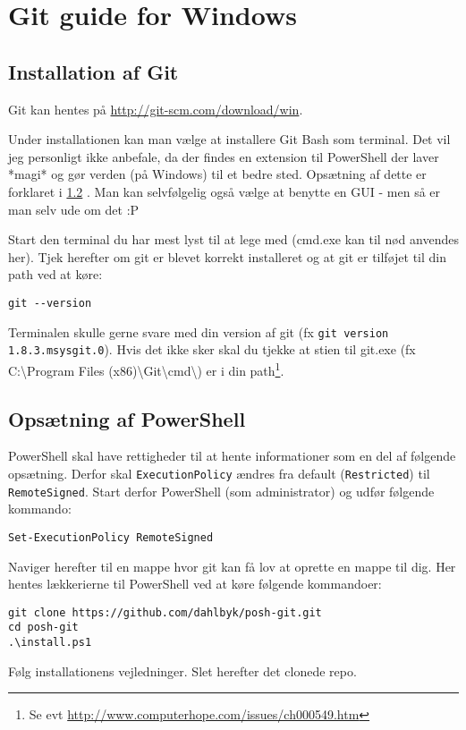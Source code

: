 \chapter{Git guide for Windows}
\section{Installation af Git}
Git kan hentes på \url{http://git-scm.com/download/win}.

Under installationen kan man vælge at installere Git Bash som terminal.
Det vil jeg personligt ikke anbefale, da der findes en extension til PowerShell der laver *magi* og gør verden (på Windows) til et bedre sted.
Opsætning af dette er forklaret i \ref{gitguide:powershell} .
Man kan selvfølgelig også vælge at benytte en GUI - men så er man selv ude om det :P

Start den terminal du har mest lyst til at lege med (cmd.exe kan til nød anvendes her).
Tjek herefter om git er blevet korrekt installeret og at git er tilføjet til din path ved at køre:
\begin{lstlisting}
git --version
\end{lstlisting}
Terminalen skulle gerne svare med din version af git (fx \texttt{git version 1.8.3.msysgit.0}).
Hvis det ikke sker skal du tjekke at stien til git.exe (fx C:\textbackslash{}Program Files (x86)\textbackslash{}Git\textbackslash{}cmd\textbackslash{}) er i din path\footnote{Se evt \url{http://www.computerhope.com/issues/ch000549.htm}}.

\section{Opsætning af PowerShell}\label{gitguide:powershell}

PowerShell skal have rettigheder til at hente informationer som en del af følgende opsætning.
Derfor skal \texttt{ExecutionPolicy} ændres fra default (\texttt{Restricted}) til \texttt{RemoteSigned}.
Start derfor PowerShell (som administrator) og udfør følgende kommando:
\begin{lstlisting}
Set-ExecutionPolicy RemoteSigned
\end{lstlisting}

Naviger herefter til en mappe hvor git kan få lov at oprette en mappe til dig.
Her hentes lækkerierne til PowerShell ved at køre følgende kommandoer:
\begin{lstlisting}
git clone https://github.com/dahlbyk/posh-git.git
cd posh-git
.\install.ps1
\end{lstlisting}
Følg installationens vejledninger.
Slet herefter det clonede repo.


